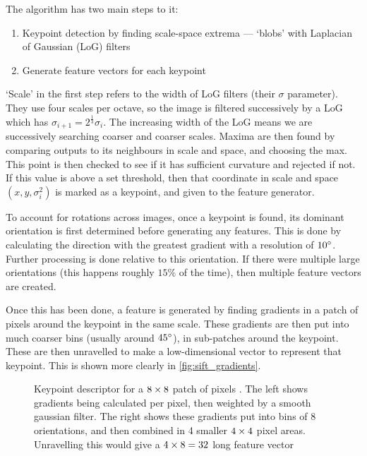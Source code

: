   The algorithm has two main steps to it:
  \begin{enumerate}
  \item Keypoint detection by finding scale-space extrema --- `blobs' with
    Laplacian of Gaussian (LoG) filters 
  \item Generate feature vectors for each keypoint
  \end{enumerate}
  `Scale' in the first step refers to the width of LoG filters (their $\sigma$
  parameter). They use four scales per octave, so the image is filtered
  successively by a LoG which has $\sigma_{i+1} = 2^{\frac{1}{3}}\sigma_i$. The
  increasing width of the LoG means we are successively searching coarser and
  coarser scales. Maxima are then found by comparing outputs to its neighbours in
  scale and space, and choosing the max. This point is then checked to see if it
  has sufficient curvature and rejected if not. If this value is above a set threshold,
  then that coordinate in scale and space $(x,y, \sigma_i^2)$ is marked as
  a keypoint, and given to the feature generator.

  To account for rotations across images, once a keypoint is found, its dominant
  orientation is first determined before generating any features. This is done by
  calculating the direction with the greatest gradient with a resolution of $10{^{\circ}}$. 
  Further processing is done relative to this orientation. If there
  were multiple large orientations (this happens roughly $15\%$ of the time),
  then multiple feature vectors are created.

  Once this has been done, a feature is generated by finding gradients in a patch
  of pixels around the keypoint in the same scale. These gradients are then put
  into much coarser bins (usually around $45{^{\circ}}$), in sub-patches around the
  keypoint. These are then unravelled to make a low-dimensional vector to
  represent that keypoint. This is shown more clearly in
  \autoref{fig:sift_gradients}.

  \begin{figure}
    \begin{center}
      \caption[SIFT descriptor applied to a keypoint]
              {Keypoint descriptor for a $8 \times 8$ patch of pixels
               \citep{lowe_distinctive_2004}. The left shows gradients being calculated per
               pixel, then weighted by a smooth gaussian filter. The right shows these
               gradients put into bins of 8 orientations, and then combined in
               4 smaller $4 \times 4$ pixel areas. Unravelling this would give a 
               $4 \times 8 = 32$ long feature vector}
       \label{fig:sift_gradients}
    \end{center}
  \end{figure}

